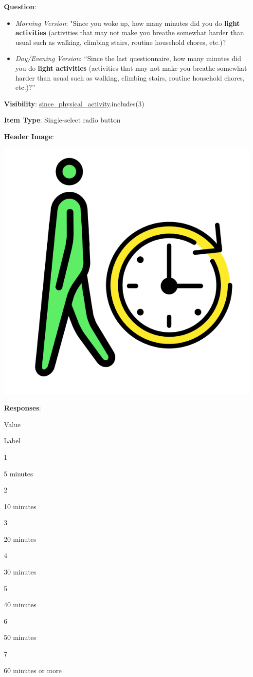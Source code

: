 \documentclass[]{book}
\providecommand{\tightlist}{%
  \setlength{\itemsep}{0pt}\setlength{\parskip}{0pt}}
\begin{document}
\textbf{Question}:

\begin{itemize}
\tightlist
\item
  \emph{Morning Version}: "Since you woke up, how many minutes did you do \textbf{light activities} (activities that may not make you breathe somewhat harder than usual such as walking, climbing stairs, routine household chores, etc.)?
\item
  \emph{Day/Evening Version}: ``Since the last questionnaire, how many minutes did you do \textbf{light activities} (activities that may not make you breathe somewhat harder than usual such as walking, climbing stairs, routine household chores, etc.)?''
\end{itemize}

\textbf{Visibility}: \protect\hyperlink{since_physical_activity}{since\_physical\_activity}.includes(3)

\textbf{Item Type}: Single-select radio button

\textbf{Header Image}:

\begin{flushleft}\includegraphics[width=0.33\linewidth]{downloadFigs4latex_NIMH_Applet_Codebook/since_light_activity_headerImg} \end{flushleft}

\textbf{Responses}:

Value

Label

1

5 minutes

2

10 minutes

3

20 minutes

4

30 minutes

5

40 minutes

6

50 minutes

7

60 minutes or more
\end{document}
